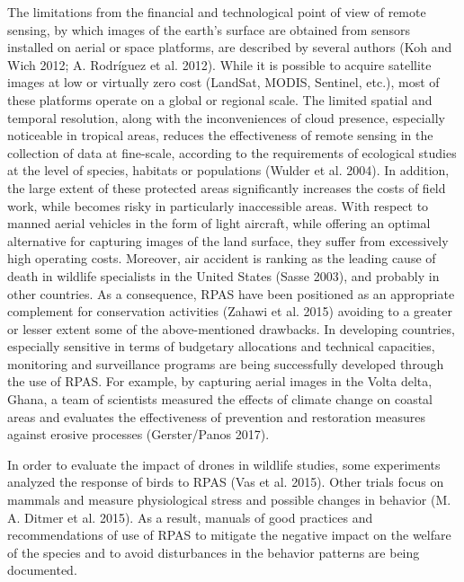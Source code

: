 \documentclass[]{interact}
\theoremstyle{plain}%
\theoremstyle{definition}
\theoremstyle{remark}
\begin{document}
The limitations from the financial and technological point of view of
remote sensing, by which images of the earth's surface are obtained from
sensors installed on aerial or space platforms, are described by several
authors (Koh and Wich 2012; A. Rodríguez et al. 2012). While it is
possible to acquire satellite images at low or virtually zero cost
(LandSat, MODIS, Sentinel, etc.), most of these platforms operate on a
global or regional scale. The limited spatial and temporal resolution,
along with the inconveniences of cloud presence, especially noticeable
in tropical areas, reduces the effectiveness of remote sensing in the
collection of data at fine-scale, according to the requirements of
ecological studies at the level of species, habitats or populations
(Wulder et al. 2004). In addition, the large extent of these protected
areas significantly increases the costs of field work, while becomes
risky in particularly inaccessible areas. With respect to manned aerial
vehicles in the form of light aircraft, while offering an optimal
alternative for capturing images of the land surface, they suffer from
excessively high operating costs. Moreover, air accident is ranking as
the leading cause of death in wildlife specialists in the United States
(Sasse 2003), and probably in other countries. As a consequence, RPAS
have been positioned as an appropriate complement for conservation
activities (Zahawi et al. 2015) avoiding to a greater or lesser extent
some of the above-mentioned drawbacks. In developing countries,
especially sensitive in terms of budgetary allocations and technical
capacities, monitoring and surveillance programs are being successfully
developed through the use of RPAS. For example, by capturing aerial
images in the Volta delta, Ghana, a team of scientists measured the
effects of climate change on coastal areas and evaluates the
effectiveness of prevention and restoration measures against erosive
processes (Gerster/Panos 2017).

In order to evaluate the impact of drones in wildlife studies, some
experiments analyzed the response of birds to RPAS (Vas et al. 2015).
Other trials focus on mammals and measure physiological stress and
possible changes in behavior (M. A. Ditmer et al. 2015). As a result,
manuals of good practices and recommendations of use of RPAS to mitigate
the negative impact on the welfare of the species and to avoid
disturbances in the behavior patterns are being documented.
\end{document}
